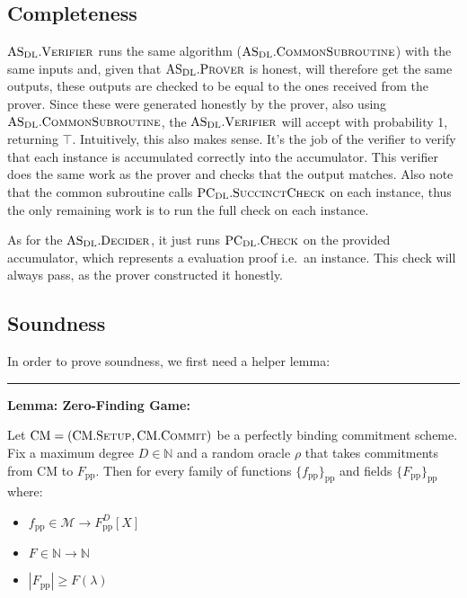 \documentclass[
]{article}
\providecommand{\tightlist}{%
  \setlength{\itemsep}{0pt}\setlength{\parskip}{0pt}}
\newcommand*\Nb{\mathbb{N}}
\newcommand*\Mc{\mathcal{M}}
\renewcommand*\l{\lambda}
\newcommand*{\pp}{\mathrm{pp}}
\newcommand*{\Setup}{\mathrm{\text{S{\scriptsize ETUP}}}}
\newcommand*{\Commit}{\mathrm{\text{C{\scriptsize OMMIT}}}}
\newcommand*{\PCDL}{\text{PC}_{\text{DL}}}
\newcommand*{\PCDLSuccinctCheck}{\PCDL.\mathrm{\text{S{\scriptsize UCCINCT}C{\scriptsize HECK}}}}
\newcommand*{\PCDLCheck}{\PCDL.\mathrm{\text{C\scriptsize HECK}}}
\newcommand*{\ASDL}{\text{AS}_{\text{DL}}}
\newcommand*{\ASDLCommonSubroutine}{\ASDL.\mathrm{\text{C{\scriptsize OMMON}S{\scriptsize UBROUTINE}}}}
\newcommand*{\ASDLProver}{\ASDL.\mathrm{\text{P\scriptsize ROVER}}}
\newcommand*{\ASDLVerifier}{\ASDL.\mathrm{\text{V\scriptsize ERIFIER}}}
\newcommand*{\ASDLDecider}{\ASDL.\mathrm{\text{D\scriptsize ECIDER}}}
\newcommand*{\CM}{\mathrm{\text{CM}}}
\newcommand*{\CMSetup}{\CM.\Setup}
\newcommand*{\CMCommit}{\CM.\Commit}
\begin{document}
\subsection{Completeness}\label{completeness-1}

\(\ASDLVerifier\) runs the same algorithm (\(\ASDLCommonSubroutine\))
with the same inputs and, given that \(\ASDLProver\) is honest, will
therefore get the same outputs, these outputs are checked to be equal to
the ones received from the prover. Since these were generated honestly
by the prover, also using \(\ASDLCommonSubroutine\), the
\(\ASDLVerifier\) will accept with probability 1, returning \(\top\).
Intuitively, this also makes sense. It's the job of the verifier to
verify that each instance is accumulated correctly into the accumulator.
This verifier does the same work as the prover and checks that the
output matches. Also note that the common subroutine calls
\(\PCDLSuccinctCheck\) on each instance, thus the only remaining work is
to run the full check on each instance.

As for the \(\ASDLDecider\), it just runs \(\PCDLCheck\) on the provided
accumulator, which represents a evaluation proof i.e.~an instance. This
check will always pass, as the prover constructed it honestly.

\subsection{Soundness}\label{soundness}

In order to prove soundness, we first need a helper lemma:

\begin{center}\rule{0.5\linewidth}{0.5pt}\end{center}

\textbf{Lemma: Zero-Finding Game:}

Let \(\CM = (\CMSetup, \CMCommit)\) be a perfectly binding commitment
scheme. Fix a maximum degree \(D \in \Nb\) and a random oracle \(\rho\)
that takes commitments from \(\CM\) to \(F_\pp\). Then for every family
of functions \(\{f_\pp\}_\pp\) and fields \(\{F_\pp\}_\pp\) where:

\begin{itemize}
\tightlist
\item
  \(f_\pp \in \Mc \to F_\pp^D[X]\)
\item
  \(F \in \Nb \to \Nb\)
\item
  \(|F_\pp| \geq F(\l)\)
\end{itemize}
\end{document}
